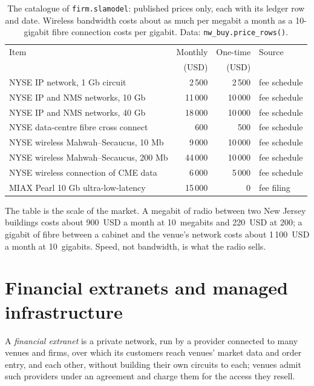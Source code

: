 \begin{table}[ht]
\centering\small
\begin{tabular}{lrrl}
\toprule
Item & Monthly & One-time & Source \\
 & (USD) & (USD) & \\
\midrule
NYSE IP network, 1 Gb circuit & 2\,500 & 2\,500 & fee schedule \\
NYSE IP and NMS networks, 10 Gb & 11\,000 & 10\,000 & fee schedule \\
NYSE IP and NMS networks, 40 Gb & 18\,000 & 10\,000 & fee schedule \\
NYSE data-centre fibre cross connect & 600 & 500 & fee schedule \\
NYSE wireless Mahwah--Secaucus, 10 Mb & 9\,000 & 10\,000 & fee schedule \\
NYSE wireless Mahwah--Secaucus, 200 Mb & 44\,000 & 10\,000 & fee schedule \\
NYSE wireless connection of CME data & 6\,000 & 5\,000 & fee schedule \\
MIAX Pearl 10 Gb ultra-low-latency & 15\,000 & 0 & fee filing \\
\bottomrule
\end{tabular}
\caption{The catalogue of \texttt{firm.slamodel}: published prices only, each with its ledger row and date. Wireless bandwidth costs about as much
per megabit a month as a 10-gigabit fibre connection costs per gigabit. Data: \texttt{nw\_buy.price\_rows()}.}\label{tab:nw:buying-connectivity:prices}
\end{table}

The table is the scale of the market. A megabit of radio between two New Jersey buildings costs about 900~USD a month at 10~megabits and
220~USD at 200; a gigabit of fibre between a cabinet and the venue's network costs about 1\,100~USD a month at 10~gigabits. Speed, not
bandwidth, is what the radio sells.

\section{Financial extranets and managed infrastructure}

\begin{definition}\label{def:nw:buying-connectivity:extranet}
A \emph{financial extranet} is a private network, run by a provider connected to many venues and firms, over which its
customers reach venues' market data and order entry, and each other, without building their own circuits to each; venues admit such providers
under an agreement and charge them for the access they resell.
\end{definition}

